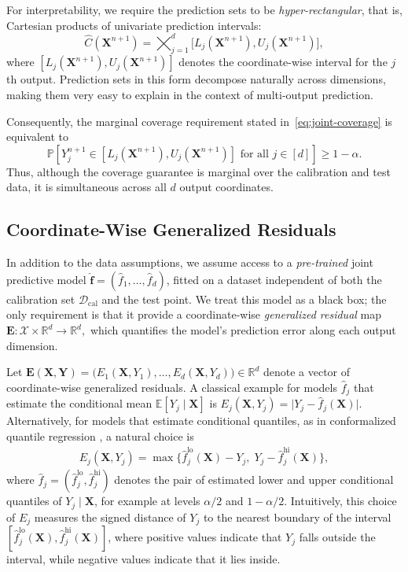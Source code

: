 For interpretability, we require the prediction sets to be \emph{hyper-rectangular}, that is, Cartesian products of univariate prediction intervals:
\begin{equation} \label{eq:rectangle}
\hat{C}(\mathbf{X}^{n+1}) 
= \bigtimes_{j=1}^d 
\bigl[ L_j(\mathbf{X}^{n+1}), 
       U_j(\mathbf{X}^{n+1}) \bigr],
     \end{equation}
where $[L_j(\mathbf{X}^{n+1}), U_j(\mathbf{X}^{n+1})]$ denotes the coordinate-wise interval for the $j$th output.  
Prediction sets in this form decompose naturally across dimensions, making them very easy to explain in the context of multi-output prediction.  
{\color{blue}Consequently, the marginal coverage
requirement stated in~\eqref{eq:joint-coverage} is equivalent to
\[
\mathbb P\left[
    {Y}_j^{n+1}\in
    [L_j(\mathbf{X}^{n+1}),U_j(\mathbf{X}^{n+1})]
    \text{ for all }j\in[d]
\right]
\geq 1-\alpha.
\]
Thus, although the coverage guarantee is marginal over the calibration and test
data, it is simultaneous across all $d$ output coordinates.


\subsection{Coordinate-Wise Generalized Residuals} \label{sec:residuals}

In addition to the data assumptions, we assume access to a \emph{pre-trained} joint predictive model $\hat{\mathbf f} = (\hat{f}_1,\ldots,\hat{f}_d)$, fitted on a dataset independent of both the calibration set $\mathcal{D}_{\mathrm{cal}}$ and the test point.
We treat this model as a black box; the only requirement is that it provide a coordinate-wise \emph{generalized residual} map $\mathbf E : \mathcal{X} \times \mathbb{R}^d \to \mathbb{R}^d,$
which quantifies the model's prediction error along each output dimension.

Let
$\mathbf E(\mathbf X,\mathbf Y)
=
\bigl(
E_1(\mathbf X,Y_1),\ldots,E_d(\mathbf X,Y_d)
\bigr)
\in\mathbb R^d$
denote a vector of coordinate-wise generalized residuals.
A classical example for models $\hat{f}_j$ that estimate the conditional mean $\mathbb{E}[Y_j\mid\mathbf X]$ \citep{lei2018distribution} is $E_j(\mathbf X,Y_j) = \lvert Y_j - \hat{f}_j(\mathbf X) \rvert$.
Alternatively, for models that estimate conditional quantiles, as in conformalized quantile regression \citep{romano2019conformalized}, a natural choice is
\begin{align*}
E_j(\mathbf X,Y_j) = \max \bigl\{\hat{f}_j^{\mathrm{lo}}(\mathbf X) - Y_j,\; Y_j - \hat{f}_j^{\mathrm{hi}}(\mathbf X)\bigr\},
\end{align*}
where $\hat{f}_j = (\hat{f}_j^{\mathrm{lo}}, \hat{f}_j^{\mathrm{hi}})$ denotes the pair of estimated lower and upper conditional quantiles of $Y_j\mid \mathbf X$, for example at levels $\alpha/2$ and $1-\alpha/2$. Intuitively, this choice of $E_j$ measures the signed distance of $Y_j$ to the nearest boundary of the interval $[\hat{f}_j^{\mathrm{lo}}(\mathbf X), \hat{f}_j^{\mathrm{hi}}(\mathbf X)]$, where
positive values indicate that $Y_j$ falls outside the interval, while negative values indicate that it lies inside.

}
